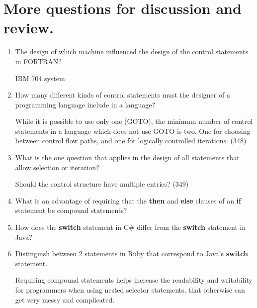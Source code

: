 \section{More questions for discussion and review.}

\begin{enumerate}
  \item The design of which machine influenced the design
    of the control statements in FORTRAN?
    
 \begin{answer}
    IBM 704 system 
     \end{answer}

  \item How many different kinds of control statements
    must the designer of a programming language include
    in a language?


 \begin{answer}
    While it is possible to use only one (GOTO), the minimum number of control statements in a language which does not use GOTO is two. One for choosing between control flow paths, and one for logically controlled iterations. (348)
 \end{answer}
 
  \item What is the one question that applies in the
    design of all statements that allow selection or
    iteration?

 \begin{answer}
    Should the control structure have multiple entries? (349)
 \end{answer}
 
  \item What is an advantage of requiring that
    the \textbf{then} and \textbf{else} clauses of
    an \textbf{if} statement be compound statements?

  \item How does the \textbf{switch} statement in C\#
    differ from the \textbf{switch} statement in Java?

  \item Distinguish between 2 statements in Ruby
    that correspond to Java's \textbf{switch} statement.

 \begin{answer}
    Requiring compound statements helps increase the readability and writability for programmers when using nested selector statements, that otherwise can get very messy and complicated.
 \end{answer}
 

\end{enumerate}
